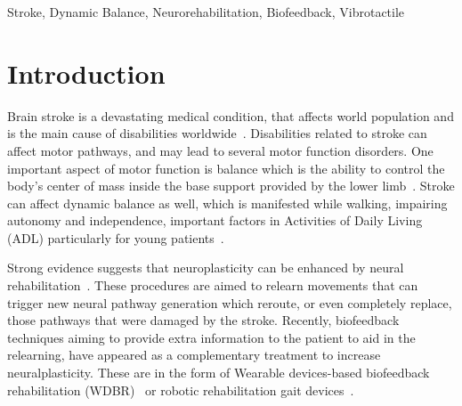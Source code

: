 \documentclass[conference]{IEEEtran}
\begin{document}
\maketitle


\begin{IEEEkeywords}
Stroke, Dynamic Balance, Neurorehabilitation, Biofeedback, Vibrotactile
\end{IEEEkeywords}

\section{Introduction}

Brain stroke is a devastating medical condition, that affects world population and is the main cause of disabilities worldwide~\cite{Caplan.etal2023}.  Disabilities related to stroke can affect motor pathways, and may lead to several motor function disorders.   One important aspect of motor function is balance which is the ability to control the body's center of mass inside the base support provided by the lower limb~\cite{Bowman2021}.  Stroke can affect dynamic balance as well,  which is manifested while walking, impairing autonomy and independence, important factors in Activities of Daily Living (ADL) particularly for young patients~\cite{Afrasiabifar.etal2020,Donato.etal2016}.


Strong evidence suggests that neuroplasticity can be enhanced by neural rehabilitation~\cite{DeAngelis.etal2021,Albert.etal2012}.  These procedures are aimed to relearn movements that can trigger new neural pathway generation which reroute, or even completely replace, those pathways that were damaged by the stroke.   Recently, biofeedback techniques aiming to provide extra information to the patient to aid in the relearning, have appeared as a complementary treatment to increase neuralplasticity. These are in the form of Wearable devices-based biofeedback rehabilitation (WDBR)~\cite{Peake.etal2018} or robotic rehabilitation gait devices~\cite{Zhao.etal2022,Peshkin.etal2005,Tong.etal2006}.  
\end{document}
